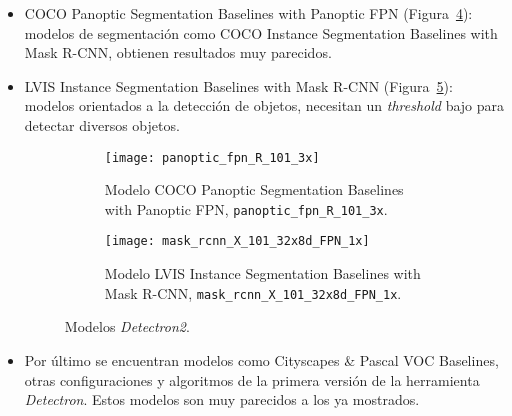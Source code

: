 {\begin{itemize}
	\begin{figure}[ht]
		\begin{subfigure}{.48\textwidth}
			\centering
			\texttt{[image: mask\_rcnn\_R\_50\_DC5\_3x]}
			\caption{Modelo COCO Instance Segmentation Baselines with Mask R-CNN, \texttt{mask\_rcnn\_R\_50\_DC5\_3x}.}
			\label{fig:mask_rcnn_R_50_DC5_3x}
		\end{subfigure}
		\begin{subfigure}{.48\textwidth}
			\centering
			\texttt{[image: keypoint\_rcnn\_R\_101\_FPN\_3x]}
			\caption{Modelo COCO Person Keypoint Detection Baselines with Keypoint R-CNN, \texttt{keypoint\_rcnn\_R\_101\_FPN\_3x}.}
			\label{fig:keypoint_rcnn_R_101_FPN_3x}
		\end{subfigure}
		\caption{Modelos \textit{Detectron2}.}
		\label{fig:m2}
	\end{figure}
	\item COCO Panoptic Segmentation Baselines with Panoptic FPN (Figura~\ref{fig:panoptic_fpn_R_101_3x}): modelos de segmentación como COCO Instance Segmentation Baselines with Mask R-CNN, obtienen resultados muy parecidos.

	\item LVIS Instance Segmentation Baselines with Mask R-CNN (Figura~\ref{fig:mask_rcnn_X_101_32x8d_FPN_1x}): modelos orientados a la detección de objetos, necesitan un \textit{threshold} bajo para detectar diversos objetos.

	\begin{figure}[ht]
		\begin{subfigure}{.48\textwidth}
			\centering
			\texttt{[image: panoptic\_fpn\_R\_101\_3x]}
			\caption{Modelo COCO Panoptic Segmentation Baselines with Panoptic FPN, \texttt{panoptic\_fpn\_R\_101\_3x}.}
			\label{fig:panoptic_fpn_R_101_3x}
		\end{subfigure}
		\begin{subfigure}{.48\textwidth}
			\centering
			\texttt{[image: mask\_rcnn\_X\_101\_32x8d\_FPN\_1x]}
			\caption{Modelo LVIS Instance Segmentation Baselines with Mask R-CNN, \texttt{mask\_rcnn\_X\_101\_32x8d\_FPN\_1x}.}
			\label{fig:mask_rcnn_X_101_32x8d_FPN_1x}
		\end{subfigure}
		\caption{Modelos \textit{Detectron2}.}
		\label{fig:m3}
	\end{figure}
	\item Por último se encuentran modelos como Cityscapes \& Pascal VOC Baselines, otras configuraciones y algoritmos de la primera versión de la herramienta \textit{Detectron}. Estos modelos son muy parecidos a los ya mostrados.
\end{itemize}

}
